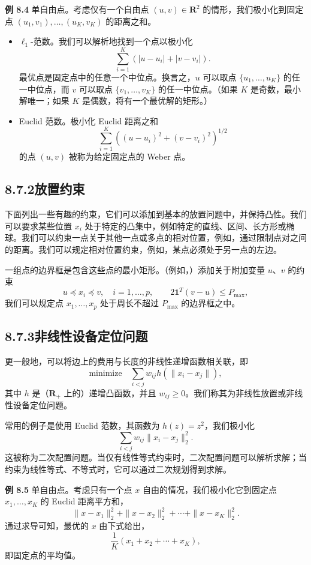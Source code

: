 \documentclass[UTF8,12pt,a4paper,fontset=fandol]{ctexart}
\begin{document}
\noindent\textbf{例 8.4}\quad
单自由点。考虑仅有一个自由点 $(u,v)\in\mathbf{R}^2$ 的情形，我们极小化到固定点 $(u_1,v_1),\ldots,(u_K,v_K)$ 的距离之和。

\begin{itemize}
\item $\ell_1$-范数。我们可以解析地找到一个点以极小化
\[
\sum_{i=1}^K(|u-u_i|+|v-v_i|).
\]
最优点是固定点中的任意一个中位点。换言之，$u$ 可以取点 $\{u_1,\ldots,u_K\}$ 的任一中位点，而 $v$ 可以取点 $\{v_1,\ldots,v_K\}$ 的任一中位点。（如果 $K$ 是奇数，最小解唯一；如果 $K$ 是偶数，将有一个最优解的矩形。）

\item Euclid 范数。极小化 Euclid 距离之和
\[
\sum_{i=1}^K\left((u-u_i)^2+(v-v_i)^2\right)^{1/2}
\]
的点 $(u,v)$ 被称为给定固定点的 Weber 点。
\end{itemize}

\subsection*{8.7.2\quad 放置约束}

下面列出一些有趣的约束，它们可以添加到基本的放置问题中，并保持凸性。我们可以要求某些位置 $x_i$ 处于特定的凸集中，例如特定的直线、区间、长方形或椭球。我们可以约束一点关于其他一点或多点的相对位置，例如，通过限制点对之间的距离。我们可以规定相对位置约束，例如，某点必须处于另一点的左边。

一组点的边界框是包含这些点的最小矩形。（例如，）添加关于附加变量 $u$、$v$ 的约束
\[
u\preceq x_i\preceq v,\quad i=1,\ldots,p,\qquad
2\mathbf{1}^T(v-u)\leq P_{\max},
\]
我们可以规定点 $x_1,\ldots,x_p$ 处于周长不超过 $P_{\max}$ 的边界框之中。

\subsection*{8.7.3\quad 非线性设备定位问题}

更一般地，可以将边上的费用与长度的非线性递增函数相关联，即
\[
\mbox{minimize}\quad \sum_{i<j} w_{ij}h(\|x_i-x_j\|),
\]
其中 $h$ 是（$\mathbf{R}_+$ 上的）递增凸函数，并且 $w_{ij}\geq 0$。我们称其为非线性放置或非线性设备定位问题。

常用的例子是使用 Euclid 范数，其函数为 $h(z)=z^2$，我们极小化
\[
\sum_{i<j}w_{ij}\|x_i-x_j\|_2^2.
\]
这被称为二次配置问题。当仅有线性等式约束时，二次配置问题可以解析求解；当约束为线性等式、不等式时，它可以通过二次规划得到求解。

\noindent\textbf{例 8.5}\quad
单自由点。考虑只有一个点 $x$ 自由的情况，我们极小化它到固定点 $x_1,\ldots,x_K$ 的 Euclid 距离平方和，
\[
\|x-x_1\|_2^2+\|x-x_2\|_2^2+\cdots+\|x-x_K\|_2^2.
\]
通过求导可知，最优的 $x$ 由下式给出，
\[
\frac{1}{K}(x_1+x_2+\cdots+x_K),
\]
即固定点的平均值。
\end{document}
